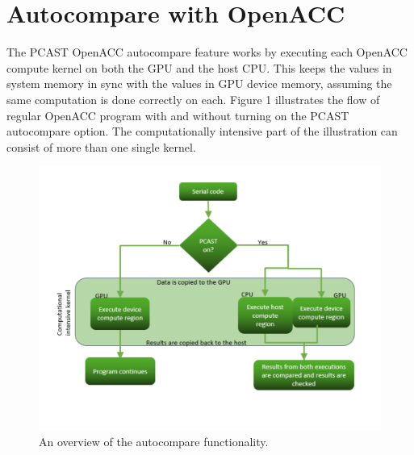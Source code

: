 \section{Autocompare with OpenACC}

The PCAST OpenACC autocompare feature works by executing each OpenACC compute kernel on both the GPU and the host CPU.
This keeps the values in system memory in sync with the values in GPU device memory, assuming the same computation is done correctly on each. Figure 1 illustrates the flow of regular OpenACC program with and without turning on the PCAST autocompare option. The computationally intensive part of the illustration can consist of more than one single kernel.

\begin{figure}[t]
    \centering
    \includegraphics [width=1\linewidth] {flow_chart.pdf}
    \caption{An overview of the autocompare functionality.}
    \label{fig:cfg_figure}
\end{figure}


